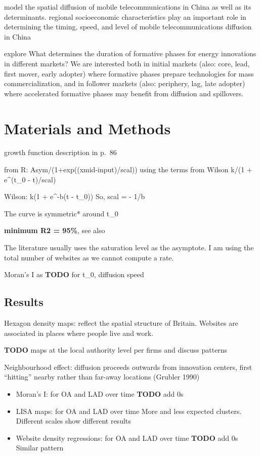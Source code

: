 \documentclass[
  authoryear,
  preprint,
  3p]{elsarticle}
\begin{document}
\citet{ding2010modeling} model the spatial diffusion of mobile
telecommunications in China as well as its determinants. regional
socioeconomic characteristics play an important role in determining the
timing, speed, and level of mobile telecommunications diffusion in China

\citet{bento2018time} explore What determines the duration of formative
phases for energy innovations in different markets? We are interested
both in initial markets (also: core, lead, first mover, early adopter)
where formative phases prepare technologies for mass commercialization,
and in follower markets (also: periphery, lag, late adopter) where
accelerated formative phases may benefit from diffusion and spillovers.

\hypertarget{sec3}{%
\section{Materials and Methods}\label{sec3}}

\citet{wilson201281} growth function description in p.~86

from R: Asym/(1+exp((xmid-input)/scal)) using the terms from Wilson k/(1
+ e\^{}(t\_0 - t)/scal)

Wilson: k(1 + e\^{}-b(t - t\_0)) So, scal = - 1/b

The curve is symmetric* around t\_0

\textbf{minimum R2 = 95\%}, see also \citet{grubler1990rise}

The literature usually uses the saturation level as the asymptote. I am
using the total number of websites as we cannot compute a rate.

Moran's I as \citet{ding2010modeling} \textbf{TODO} for t\_0, diffusion
speed

\hypertarget{sec3.1}{%
\subsection{Results}\label{sec3.1}}

Hexagon density maps: reflect the spatial structure of Britain. Websites
are associated in places where people live and work.

\textbf{TODO} maps at the local authority level per firms and discuss
patterns

Neighbourhood effect: diffusion proceeds outwards from innovation
centers, first ``hitting'' nearby rather than far-away locations
(Grubler 1990)

\begin{itemize}
\item
  Moran's I: for OA and LAD over time \textbf{TODO} add 0s
\item
  LISA maps: for OA and LAD over time More and less expected clusters.
  Different scales show different results
\item
  Website density regressions: for OA and LAD over time \textbf{TODO}
  add 0s Similar pattern
\end{itemize}
\end{document}

